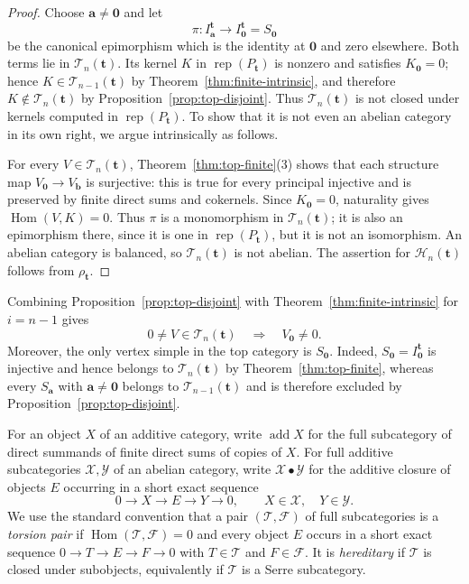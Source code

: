 \documentclass[12pt,reqno]{amsart}
\theoremstyle{definition}
\theoremstyle{remark}
\newcommand{\Rep}{\operatorname{rep}}
\newcommand{\Hom}{\operatorname{Hom}}
\begin{document}
\begin{proof}
Choose $\mathbf a\ne\mathbf0$ and let
\[
\pi:I^{\mathbf t}_{\mathbf a}\longrightarrow
I^{\mathbf t}_{\mathbf0}=S_{\mathbf0}
\]
be the canonical epimorphism which is the identity at $\mathbf0$ and zero
elsewhere.  Both terms lie in $\mathcal T_n(\mathbf t)$.  Its kernel $K$ in
$\Rep(P_{\mathbf t})$ is nonzero and satisfies $K_{\mathbf0}=0$; hence
$K\in\mathcal T_{n-1}(\mathbf t)$ by
Theorem~\ref{thm:finite-intrinsic}, and therefore
$K\notin\mathcal T_n(\mathbf t)$ by Proposition~\ref{prop:top-disjoint}.
Thus $\mathcal T_n(\mathbf t)$ is not closed under kernels computed in
$\Rep(P_{\mathbf t})$.  To show that it is not even an abelian category in
its own right, we argue intrinsically as follows.

For every $V\in\mathcal T_n(\mathbf t)$, Theorem~\ref{thm:top-finite}(3)
shows that each structure map $V_{\mathbf0}\to V_{\mathbf b}$ is surjective:
this is true for every principal injective and is preserved by finite direct
sums and cokernels.  Since $K_{\mathbf0}=0$, naturality gives
$\Hom(V,K)=0$.  Thus $\pi$ is a monomorphism in
$\mathcal T_n(\mathbf t)$; it is also an epimorphism there, since it is one in
$\Rep(P_{\mathbf t})$, but it is not an isomorphism.  An abelian category is
balanced, so $\mathcal T_n(\mathbf t)$ is not abelian.  The assertion for
$\mathcal H_n(\mathbf t)$ follows from $\rho_{\mathbf t}$.
\end{proof}

Combining Proposition~\ref{prop:top-disjoint} with Theorem~\ref{thm:finite-intrinsic} for $i=n-1$ gives
\[
0\ne V\in\mathcal T_n(\mathbf t)
\quad\Longrightarrow\quad
V_{\mathbf0}\ne0.
\]
Moreover, the only vertex simple in the top category is $S_{\mathbf0}$.  Indeed, $S_{\mathbf0}=I^{\mathbf t}_{\mathbf0}$ is injective and hence belongs to $\mathcal T_n(\mathbf t)$ by Theorem~\ref{thm:top-finite}, whereas every $S_{\mathbf a}$ with $\mathbf a\ne\mathbf0$ belongs to $\mathcal T_{n-1}(\mathbf t)$ and is therefore excluded by Proposition~\ref{prop:top-disjoint}.

For an object $X$ of an additive category, write $\operatorname{add}X$ for
the full subcategory of direct summands of finite direct sums of copies of
$X$.  For full additive subcategories $\mathcal X,\mathcal Y$ of an abelian
category, write $\mathcal X\bullet\mathcal Y$ for the additive closure of
objects $E$ occurring in a short exact sequence
\[
0\longrightarrow X\longrightarrow E\longrightarrow Y\longrightarrow0,
\qquad X\in\mathcal X,\quad Y\in\mathcal Y.
\]
We use the standard convention that a pair $(\mathcal T,\mathcal F)$ of full
subcategories is a \emph{torsion pair} if
$\Hom(\mathcal T,\mathcal F)=0$ and every object $E$ occurs in a short exact
sequence $0\to T\to E\to F\to0$ with $T\in\mathcal T$ and
$F\in\mathcal F$.  It is \emph{hereditary} if $\mathcal T$ is closed under
subobjects, equivalently if $\mathcal T$ is a Serre subcategory.
\end{document}
